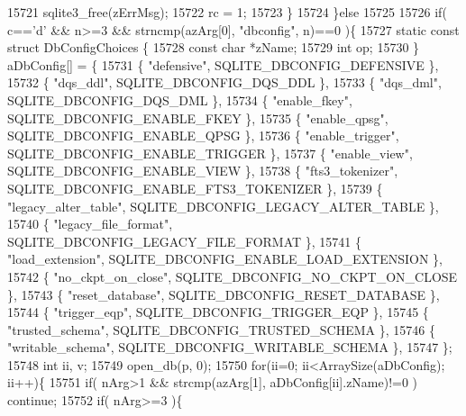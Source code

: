\begin{DoxyCode}
{{{{{{{{15721       sqlite3_free(zErrMsg);
15722       rc = 1;
15723     \}
15724   \}\textcolor{keywordflow}{else}
15725 
15726   \textcolor{keywordflow}{if}( c==\textcolor{charliteral}{'d'} && n>=3 && strncmp(azArg[0], \textcolor{stringliteral}{"dbconfig"}, n)==0 )\{
15727     \textcolor{keyword}{static} \textcolor{keyword}{const} \textcolor{keyword}{struct }DbConfigChoices \{
15728       \textcolor{keyword}{const} \textcolor{keywordtype}{char} *zName;
15729       \textcolor{keywordtype}{int} op;
15730     \} aDbConfig[] = \{
15731         \{ \textcolor{stringliteral}{"defensive"},          SQLITE_DBCONFIG_DEFENSIVE             \},
15732         \{ \textcolor{stringliteral}{"dqs\_ddl"},            SQLITE_DBCONFIG_DQS_DDL               \},
15733         \{ \textcolor{stringliteral}{"dqs\_dml"},            SQLITE_DBCONFIG_DQS_DML               \},
15734         \{ \textcolor{stringliteral}{"enable\_fkey"},        SQLITE_DBCONFIG_ENABLE_FKEY           \},
15735         \{ \textcolor{stringliteral}{"enable\_qpsg"},        SQLITE_DBCONFIG_ENABLE_QPSG           \},
15736         \{ \textcolor{stringliteral}{"enable\_trigger"},     SQLITE_DBCONFIG_ENABLE_TRIGGER        \},
15737         \{ \textcolor{stringliteral}{"enable\_view"},        SQLITE_DBCONFIG_ENABLE_VIEW           \},
15738         \{ \textcolor{stringliteral}{"fts3\_tokenizer"},     SQLITE_DBCONFIG_ENABLE_FTS3_TOKENIZER \},
15739         \{ \textcolor{stringliteral}{"legacy\_alter\_table"}, SQLITE_DBCONFIG_LEGACY_ALTER_TABLE    \},
15740         \{ \textcolor{stringliteral}{"legacy\_file\_format"}, SQLITE_DBCONFIG_LEGACY_FILE_FORMAT    \},
15741         \{ \textcolor{stringliteral}{"load\_extension"},     SQLITE_DBCONFIG_ENABLE_LOAD_EXTENSION \},
15742         \{ \textcolor{stringliteral}{"no\_ckpt\_on\_close"},   SQLITE_DBCONFIG_NO_CKPT_ON_CLOSE      \},
15743         \{ \textcolor{stringliteral}{"reset\_database"},     SQLITE_DBCONFIG_RESET_DATABASE        \},
15744         \{ \textcolor{stringliteral}{"trigger\_eqp"},        SQLITE_DBCONFIG_TRIGGER_EQP           \},
15745         \{ \textcolor{stringliteral}{"trusted\_schema"},     SQLITE_DBCONFIG_TRUSTED_SCHEMA        \},
15746         \{ \textcolor{stringliteral}{"writable\_schema"},    SQLITE_DBCONFIG_WRITABLE_SCHEMA       \},
15747     \};
15748     \textcolor{keywordtype}{int} ii, v;
15749     open_db(p, 0);
15750     \textcolor{keywordflow}{for}(ii=0; ii<ArraySize(aDbConfig); ii++)\{
15751       \textcolor{keywordflow}{if}( nArg>1 && strcmp(azArg[1], aDbConfig[ii].zName)!=0 ) \textcolor{keywordflow}{continue};
15752       \textcolor{keywordflow}{if}( nArg>=3 )\{
}}}}}}}}
\end{DoxyCode}

